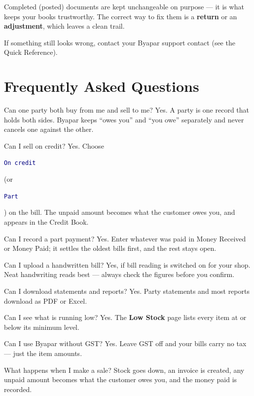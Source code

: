 \documentclass[11pt,a4paper,openany]{report}
\newcommand{\ui}[1]{\colorbox{panel}{\rule[-3pt]{0pt}{11pt}\texttt{\textcolor{navy}{#1}}}}
\begin{document}
\begin{notebox}
Completed (posted) documents are kept unchangeable on purpose — it is what keeps
your books trustworthy. The correct way to fix them is a \textbf{return} or an
\textbf{adjustment}, which leaves a clean trail.
\end{notebox}

If something still looks wrong, contact your Byapar support contact (see the Quick
Reference).

\chapter{Frequently Asked Questions}
\begin{faqbox}{Can one party both buy from me and sell to me?}
Yes. A party is one record that holds both sides. Byapar keeps ``owes you'' and
``you owe'' separately and never cancels one against the other.
\end{faqbox}
\begin{faqbox}{Can I sell on credit?}
Yes. Choose \ui{On credit} (or \ui{Part}) on the bill. The unpaid amount becomes
what the customer owes you, and appears in the Credit Book.
\end{faqbox}
\begin{faqbox}{Can I record a part payment?}
Yes. Enter whatever was paid in Money Received or Money Paid; it settles the
oldest bills first, and the rest stays open.
\end{faqbox}
\begin{faqbox}{Can I upload a handwritten bill?}
Yes, if bill reading is switched on for your shop. Neat handwriting reads best —
always check the figures before you confirm.
\end{faqbox}
\begin{faqbox}{Can I download statements and reports?}
Yes. Party statements and most reports download as PDF or Excel.
\end{faqbox}
\begin{faqbox}{Can I see what is running low?}
Yes. The \textbf{Low Stock} page lists every item at or below its minimum level.
\end{faqbox}
\begin{faqbox}{Can I use Byapar without GST?}
Yes. Leave GST off and your bills carry no tax — just the item amounts.
\end{faqbox}
\begin{faqbox}{What happens when I make a sale?}
Stock goes down, an invoice is created, any unpaid amount becomes what the customer
owes you, and the money paid is recorded.
\end{faqbox}
\end{document}
